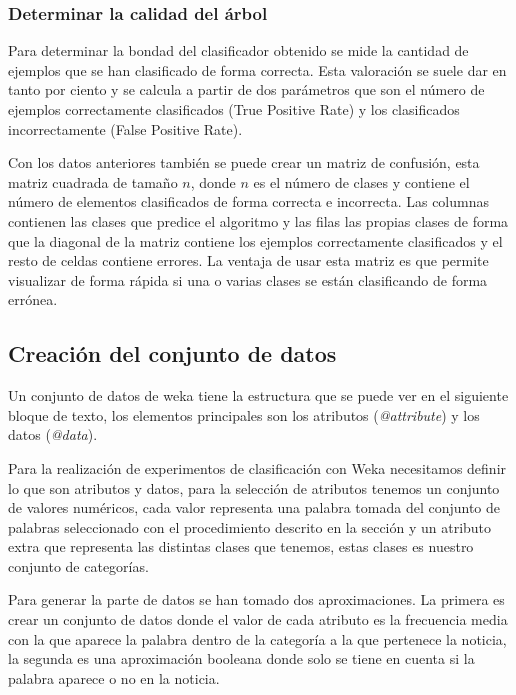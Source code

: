 \subsubsection{Determinar la calidad del árbol}
Para determinar la bondad del clasificador obtenido se mide la cantidad de ejemplos que se han clasificado de forma correcta. Esta valoración se suele dar en tanto por ciento y se calcula a partir de dos parámetros que son el número de ejemplos correctamente clasificados (True Positive Rate) y los clasificados incorrectamente (False Positive Rate). 

Con los datos anteriores también se puede crear un matriz de confusión, esta matriz cuadrada de tamaño $n$, donde $n$ es el número de clases y contiene el número de elementos clasificados de forma correcta e incorrecta. Las columnas contienen las clases que predice el algoritmo y las filas las propias clases de forma que la diagonal de la matriz contiene los ejemplos correctamente clasificados y el resto de celdas contiene errores. La ventaja de usar esta matriz es que permite visualizar de forma rápida si una o varias clases se están clasificando de forma errónea. \cite{B3}
\subsection{Creación del conjunto de datos}

Un conjunto de datos de weka tiene la estructura que se puede ver en el siguiente bloque de texto, los elementos principales son los atributos (\textit{@attribute}) y los datos (\textit{@data}).

Para la realización de experimentos de clasificación con Weka necesitamos definir lo que son atributos y datos, para la selección de atributos tenemos un conjunto de valores numéricos, cada valor representa una palabra tomada del conjunto de palabras seleccionado con el procedimiento descrito en la sección  y un atributo extra que representa las distintas clases que tenemos, estas clases es nuestro conjunto de categorías. 

Para generar la parte de datos se han tomado dos aproximaciones. La primera es crear un conjunto de datos donde el valor de cada atributo es la frecuencia media con la que aparece la palabra dentro de la categoría a la que pertenece la noticia, la segunda es una aproximación booleana donde solo se tiene en cuenta si la palabra aparece o no en la noticia.

